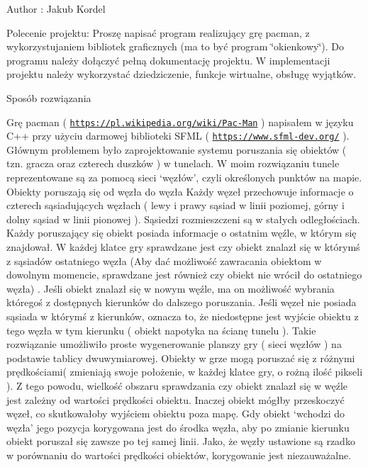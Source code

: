 \begin{DoxyAuthor}{Author}
\+: Jakub Kordel
\end{DoxyAuthor}
Polecenie projektu\+: Proszę napisać program realizujący grę pacman, z wykorzystujaniem bibliotek graficznych (ma to być program \char`\"{}okienkowy\char`\"{}). Do programu należy dołączyć pełną dokumentację projektu. W implementacji projektu należy wykorzystać dziedziczenie, funkcje wirtualne, obsługę wyjątków.

Sposób rozwiązania

Grę pacman ( \href{https://pl.wikipedia.org/wiki/Pac-Man}{\tt https\+://pl.\+wikipedia.\+org/wiki/\+Pac-\/\+Man} ) napisałem w języku C++ przy użyciu darmowej biblioteki S\+F\+ML ( \href{https://www.sfml-dev.org/}{\tt https\+://www.\+sfml-\/dev.\+org/} ). Głównym problemem było zaprojektowanie systemu poruszania się obiektów ( tzn. gracza oraz czterech duszków ) w tunelach. W moim rozwiązaniu tunele reprezentowane są za pomocą sieci ‘węzłów’, czyli określonych punktów na mapie. Obiekty poruszają się od węzła do węzła Każdy węzeł przechowuje informacje o czterech sąsiadujących węzłach ( lewy i prawy sąsiad w linii poziomej, górny i dolny sąsiad w linii pionowej ). Sąsiedzi rozmieszczeni są w stałych odległościach. Każdy poruszający się obiekt posiada informacje o ostatnim węźle, w którym się znajdował. W każdej klatce gry sprawdzane jest czy obiekt znalazł się w którymś z sąsiadów ostatniego węzła (Aby dać możliwość zawracania obiektom w dowolnym momencie, sprawdzane jest również czy obiekt nie wrócił do ostatniego węzła) . Jeśli obiekt znalazł się w nowym węźle, ma on możliwość wybrania któregoś z dostępnych kierunków do dalszego poruszania. Jeśli węzeł nie posiada sąsiada w którymś z kierunków, oznacza to, że niedostępne jest wyjście obiektu z tego węzła w tym kierunku ( obiekt napotyka na ścianę tunelu ). Takie rozwiązanie umożliwiło proste wygenerowanie planszy gry ( sieci węzłów ) na podstawie tablicy dwuwymiarowej. Obiekty w grze mogą poruszać się z różnymi prędkościami( zmieniają swoje położenie, w każdej klatce gry, o rożną ilość pikseli ). Z tego powodu, wielkość obszaru sprawdzania czy obiekt znalazł się w węźle jest zależny od wartości prędkości obiektu. Inaczej obiekt mógłby przeskoczyć węzeł, co skutkowałoby wyjściem obiektu poza mapę. Gdy obiekt ‘wchodzi do węzła’ jego pozycja korygowana jest do środka węzła, aby po zmianie kierunku obiekt poruszał się zawsze po tej samej linii. Jako, że węzły ustawione są rzadko w porównaniu do wartości prędkości obiektów, korygowanie jest niezauważalne. 